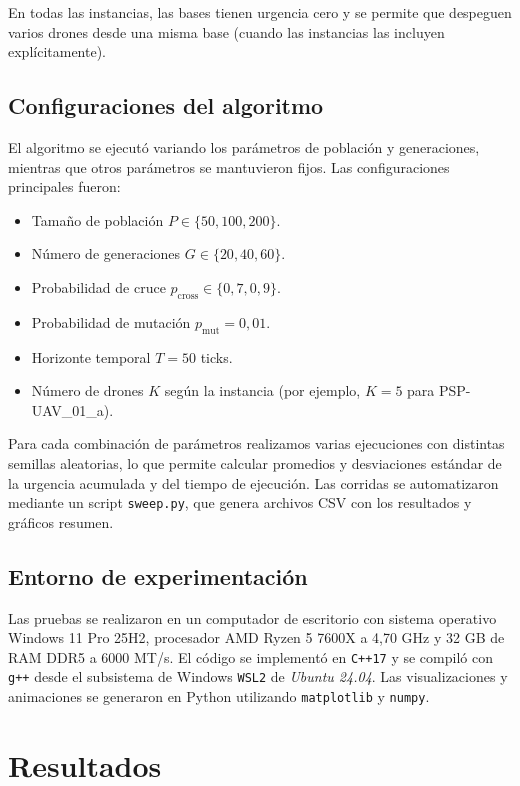 \documentclass[11pt,a4paper]{article}
\begin{document}
En todas las instancias, las bases tienen urgencia cero y se permite que despeguen varios drones desde una misma base (cuando las instancias las incluyen explícitamente).

\subsection{Configuraciones del algoritmo}

El algoritmo se ejecutó variando los parámetros de población y generaciones, mientras que otros parámetros se mantuvieron fijos. Las configuraciones principales fueron:

\begin{itemize}
    \item Tamaño de población $P \in \{50, 100, 200\}$.
    \item Número de generaciones $G \in \{20, 40, 60\}$.
    \item Probabilidad de cruce $p_{\text{cross}} \in \{0{,}7, 0{,}9\}$.
    \item Probabilidad de mutación $p_{\text{mut}} = 0{,}01$.
    \item Horizonte temporal $T = 50$ ticks.
    \item Número de drones $K$ según la instancia (por ejemplo, $K=5$ para PSP-UAV\_01\_a).
\end{itemize}

Para cada combinación de parámetros realizamos varias ejecuciones con distintas semillas aleatorias, lo que permite calcular promedios y desviaciones estándar de la urgencia acumulada y del tiempo de ejecución. Las corridas se automatizaron mediante un script \texttt{sweep.py}, que genera archivos CSV con los resultados y gráficos resumen.

\subsection{Entorno de experimentación}

Las pruebas se realizaron en un computador de escritorio con sistema operativo Windows 11 Pro 25H2, procesador AMD Ryzen 5 7600X a 4,70 GHz y 32 GB de RAM DDR5 a 6000 MT/s. El código se implementó en \texttt{C++17} y se compiló con \texttt{g++} desde el subsistema de Windows \texttt{WSL2} de \emph{Ubuntu 24.04}. Las visualizaciones y animaciones se generaron en Python utilizando \texttt{matplotlib} y \texttt{numpy}.



\section{Resultados}
\label{sec:resultados}
\end{document}
